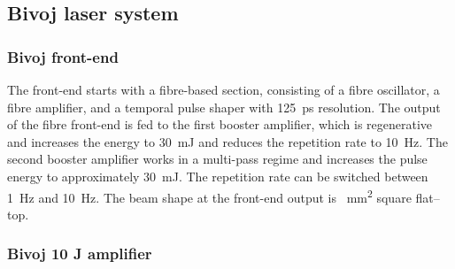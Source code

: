\subsection{Bivoj laser system}

\subsubsection*{Bivoj front-end}

The front-end starts with a fibre-based section, consisting
of a fibre oscillator, a fibre amplifier, and a temporal pulse shaper
with \SI{125}{\ps} resolution. The output of the fibre front-end is fed
to the first booster amplifier, which is regenerative and
increases the energy to \SI{30}{\milli\joule} and reduces the repetition rate to \SI{10}{\hertz}. The second booster amplifier works in a multi-pass regime
and increases the pulse energy to approximately \SI{30}{\milli\joule}.
The repetition rate can be switched between \SI{1}{\hertz} and \SI{10}{\hertz}. The 
beam shape at the front-end output is  \SI{}{\mm\squared} square flat--top.

\subsubsection*{Bivoj 10 J amplifier}

